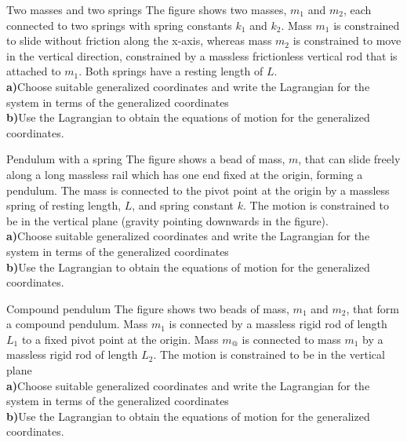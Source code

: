\begin{problem}{Two masses and two springs}
\label{prob_Lagrange_4}
The figure shows two masses, $m_1$ and $m_2$, each connected to two springs with spring constants $k_1$ and $k_2$. Mass $m_1$ is constrained to slide without friction along the x-axis, whereas mass $m_2$ is constrained to move in the vertical direction, constrained by a massless frictionless vertical rod that is attached to $m_1$. Both springs have a resting length of $L$.
\\
\textbf{a)}Choose suitable generalized coordinates and write the Lagrangian for the system in terms of the generalized coordinates\\
\textbf{b)}Use the Lagrangian to obtain the equations of motion for the generalized coordinates.
\end{problem}

\begin{problem}{Pendulum with a spring}
\label{prob_Lagrange_5}
The figure shows a bead of mass, $m$, that can slide freely along a long massless rail which has one end fixed at the origin, forming a pendulum. The mass is connected to the pivot point at the origin by a massless spring of resting length, $L$, and spring constant $k$. The motion is constrained to be in the vertical plane (gravity pointing downwards in the figure).
\\
\textbf{a)}Choose suitable generalized coordinates and write the Lagrangian for the system in terms of the generalized coordinates\\
\textbf{b)}Use the Lagrangian to obtain the equations of motion for the generalized coordinates.
\end{problem}


\begin{problem}{Compound pendulum}
\label{prob_Lagrange_6}
The figure shows two beads of mass, $m_1$ and $m_2$, that form a compound pendulum. Mass $m_1$ is connected by a massless rigid rod of length $L_1$ to a fixed pivot point at the origin. Mass $m_@$ is connected to mass $m_1$ by a massless rigid rod of length $L_2$. The motion is constrained to be in the vertical plane
\\
\textbf{a)}Choose suitable generalized coordinates and write the Lagrangian for the system in terms of the generalized coordinates\\
\textbf{b)}Use the Lagrangian to obtain the equations of motion for the generalized coordinates.
\end{problem}

